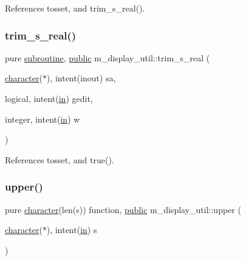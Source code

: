 References tosset, and trim\+\_\+s\+\_\+real().

\mbox{\label{namespacem__display__util_ab69265e4c62f2b4c20d1a2b59e25959b}} 
\subsubsection{\texorpdfstring{trim\+\_\+s\+\_\+real()}{trim\_s\_real()}}
{\footnotesize\ttfamily pure \hyperlink{M__stopwatch_83_8txt_acfbcff50169d691ff02d4a123ed70482}{subroutine}, \hyperlink{M__stopwatch_83_8txt_a2f74811300c361e53b430611a7d1769f}{public} m\+\_\+display\+\_\+util\+::trim\+\_\+s\+\_\+real (\begin{DoxyParamCaption}\item[{\hyperlink{option__stopwatch_83_8txt_abd4b21fbbd175834027b5224bfe97e66}{character}($\ast$), intent(inout)}]{sa,  }\item[{logical, intent(\hyperlink{M__journal_83_8txt_afce72651d1eed785a2132bee863b2f38}{in})}]{gedit,  }\item[{integer, intent(\hyperlink{M__journal_83_8txt_afce72651d1eed785a2132bee863b2f38}{in})}]{w }\end{DoxyParamCaption})}



References tosset, and true().

\mbox{\label{namespacem__display__util_a6a829115368f9e77c8b35fb1c86ac9c3}} 
\subsubsection{\texorpdfstring{upper()}{upper()}}
{\footnotesize\ttfamily pure \hyperlink{option__stopwatch_83_8txt_abd4b21fbbd175834027b5224bfe97e66}{character}(len(s)) function, \hyperlink{M__stopwatch_83_8txt_a2f74811300c361e53b430611a7d1769f}{public} m\+\_\+display\+\_\+util\+::upper (\begin{DoxyParamCaption}\item[{\hyperlink{option__stopwatch_83_8txt_abd4b21fbbd175834027b5224bfe97e66}{character}($\ast$), intent(\hyperlink{M__journal_83_8txt_afce72651d1eed785a2132bee863b2f38}{in})}]{s }\end{DoxyParamCaption})}



